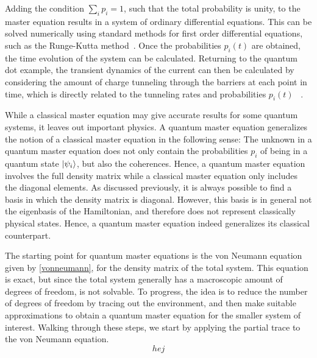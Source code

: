 \documentclass[../main.tex]{subfiles}
\begin{document}
Adding the condition $\sum_i p_i = 1$, such that the total probability is unity, to the master equation results in a system of ordinary differential equations. This can be solved numerically using standard methods for first order differential equations, such as the Runge-Kutta method~\cite{iserles}. Once the probabilities $p_i(t)$ are obtained, the time evolution of the system can be calculated. Returning to the quantum dot example, the transient dynamics of the current can then be calculated by considering the amount of charge tunneling through the barriers at each point in time, which is directly related to the tunneling rates and probabilities $p_i(t)$ ~\cite{transport}.

While a classical master equation may give accurate results for some quantum systems, it leaves out important physics. A quantum master equation generalizes the notion of a classical master equation in the following sense: The unknown in a quantum master equation does not only contain the probabilities $p_i$ of being in a quantum state $\ket{\psi_i}$, but also the coherences. Hence, a quantum master equation involves the full density matrix while a classical master equation only includes the diagonal elements. As discussed previously, it is always possible to find a basis in which the density matrix is diagonal. However, this basis is in general not the eigenbasis of the Hamiltonian, and therefore does not represent classically physical states. Hence, a quantum master equation indeed generalizes its classical counterpart.

The starting point for quantum master equations is the von Neumann equation given by \cref{vonneumann}, for the density matrix of the total system. This equation is exact, but since the total system generally has a macroscopic amount of degrees of freedom, is not solvable. To progress, the idea is to reduce the number of degrees of freedom by tracing out the environment, and then make suitable approximations to obtain a quantum master equation for the smaller system of interest. Walking through these steps, we start by applying the partial trace to the von Neumann equation.
\begin{equation}
   hej 
\end{equation}
\end{document}
